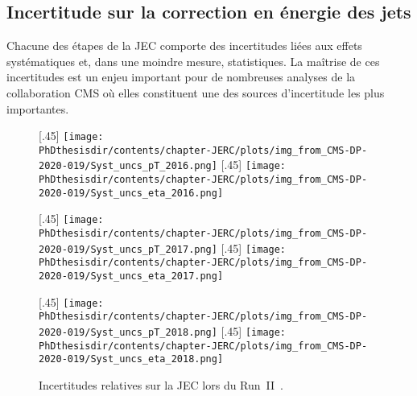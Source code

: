 \subsection{Incertitude sur la correction en énergie des jets}\label{chapter-JERC-section-CMS-subsec-unc}
Chacune des étapes de la JEC comporte des incertitudes liées aux effets systématiques et, dans une moindre mesure, statistiques.
La maîtrise de ces incertitudes est un enjeu important pour de nombreuses analyses de la collaboration CMS où elles constituent une des sources d'incertitude les plus importantes.
\begin{figure}[p]
\centering
{}[.45\textwidth]
{\texttt{[image: \\PhDthesisdir/contents/chapter-JERC/plots/img\_from\_CMS-DP-2020-019/Syst\_uncs\_pT\_2016.png]}\vspace{-.5\baselineskip}}
\hfill
{}[.45\textwidth]
{\texttt{[image: \\PhDthesisdir/contents/chapter-JERC/plots/img\_from\_CMS-DP-2020-019/Syst\_uncs\_eta\_2016.png]}\vspace{-.5\baselineskip}}

\vspace{.75\baselineskip}

[.45\textwidth]
{\texttt{[image: \\PhDthesisdir/contents/chapter-JERC/plots/img\_from\_CMS-DP-2020-019/Syst\_uncs\_pT\_2017.png]}\vspace{-.5\baselineskip}}
\hfill
{}[.45\textwidth]
{\texttt{[image: \\PhDthesisdir/contents/chapter-JERC/plots/img\_from\_CMS-DP-2020-019/Syst\_uncs\_eta\_2017.png]}\vspace{-.5\baselineskip}}

\vspace{.75\baselineskip}

[.45\textwidth]
{\texttt{[image: \\PhDthesisdir/contents/chapter-JERC/plots/img\_from\_CMS-DP-2020-019/Syst\_uncs\_pT\_2018.png]}\vspace{-.5\baselineskip}}
\hfill
{}[.45\textwidth]
{\texttt{[image: \\PhDthesisdir/contents/chapter-JERC/plots/img\_from\_CMS-DP-2020-019/Syst\_uncs\_eta\_2018.png]}\vspace{-.5\baselineskip}}

\caption[Incertitudes relatives sur la JEC en fonction de \pT\ et $\eta$ lors du Run~II.]{Incertitudes relatives sur la JEC lors du Run~II~\cite{CMS-DP-2020-019}.}
\label{fig-Syst_uncs_JEC_RunII}
\end{figure}
